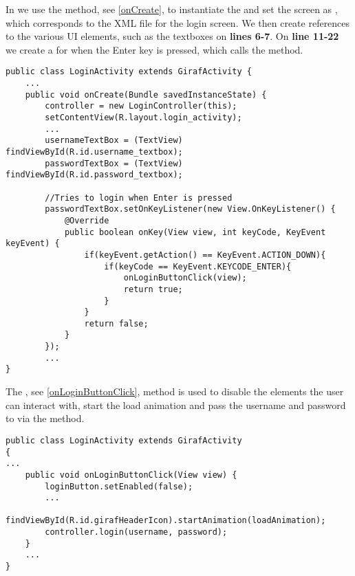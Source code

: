 In  we use the  method, see
\autoref{onCreate}, to instantiate the  and set the
screen as , which corresponds to the XML
file for the login screen. We then create references to the various UI elements,
such as the textboxes on \textbf{lines 6-7}. On \textbf{line 11-22} we create a
 for when the Enter key is pressed, which calls the
 method.\nl

\begin{minipage}[H]{\linewidth}
\begin{lstlisting}[caption = Creating the correct references when logging in,
label = onCreate] public class LoginActivity extends GirafActivity {
	...
	public void onCreate(Bundle savedInstanceState) {
		controller = new LoginController(this);
    	setContentView(R.layout.login_activity);
		...
        usernameTextBox = (TextView) findViewById(R.id.username_textbox);
        passwordTextBox = (TextView) findViewById(R.id.password_textbox);
        
        //Tries to login when Enter is pressed
        passwordTextBox.setOnKeyListener(new View.OnKeyListener() {
            @Override
            public boolean onKey(View view, int keyCode, KeyEvent keyEvent) {
                if(keyEvent.getAction() == KeyEvent.ACTION_DOWN){
                    if(keyCode == KeyEvent.KEYCODE_ENTER){
                        onLoginButtonClick(view);
                        return true;
                    }
                }
                return false;
            }
        });
        ...
}
\end{lstlisting}
\end{minipage}

The , see \autoref{onLoginButtonClick}, method is used
to disable the elements the user can interact with, start the load animation and
pass the username and password to  via the 
method.\nl

\begin{minipage}[H]{\linewidth}
\begin{lstlisting}[caption = Passes the user information and begins the waiting animation, label = onLoginButtonClick] 
public class LoginActivity extends GirafActivity 
{ 
...
	public void onLoginButtonClick(View view) {
        loginButton.setEnabled(false);
 		...
        findViewById(R.id.girafHeaderIcon).startAnimation(loadAnimation);
        controller.login(username, password);
    }
	...
}
\end{lstlisting}
\end{minipage}


